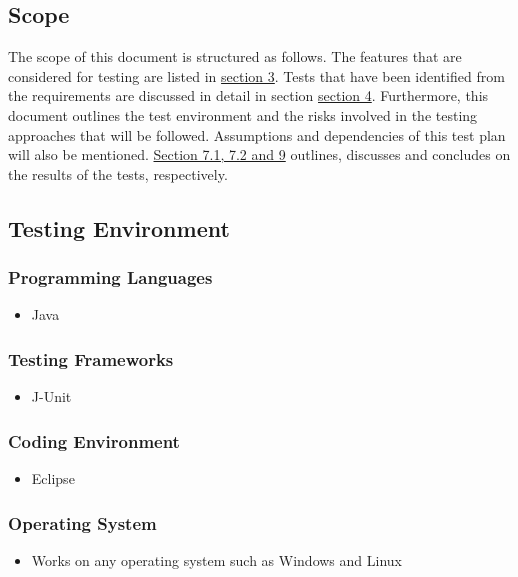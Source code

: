 \documentclass[a4paper,12pt]{report}
\begin{document}
	\subsection {Scope}
		The scope of this document is structured as follows. The features that are considered for
		testing are listed in \hyperref[sec:Features]{section 3}. Tests that have been identified from the requirements are
		discussed in detail in section  \hyperref[sec:Cases]{section 4}. Furthermore, this document outlines the test environment
		and the risks involved in the testing approaches that will be followed. Assumptions and
		dependencies of this test plan will also be mentioned.  \hyperref[sec:Results]{Section 7.1, 7.2 and 9} outlines,
		discusses and concludes on the results of the tests, respectively.
		
	\subsection {Testing Environment}
		\subsubsection{Programming Languages}
			\begin {itemize}
				\item Java
			\end {itemize}
		\subsubsection{Testing Frameworks}
			\begin {itemize}
				\item J-Unit
			\end {itemize}
		\subsubsection{Coding Environment}
			\begin {itemize}
				\item Eclipse
			\end {itemize}
		\subsubsection{Operating System}
			\begin {itemize}
				\item Works on any operating system such as Windows and Linux
			\end {itemize}
	
\end{document}
